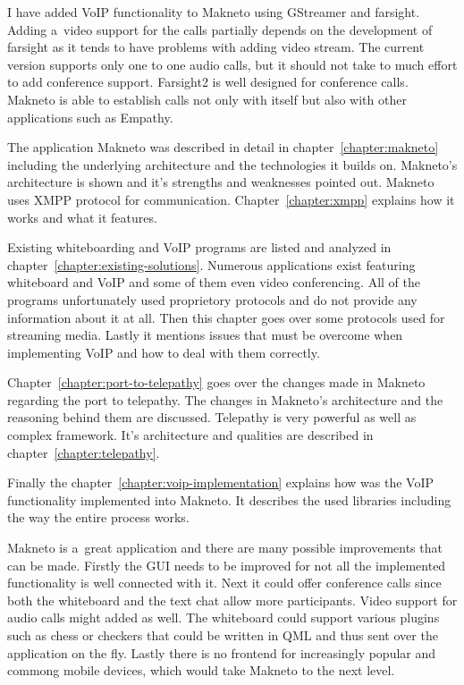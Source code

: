 I have added VoIP functionality to Makneto using GStreamer and farsight. Adding a~video support for the calls partially depends on the development of farsight as it tends to have problems with adding video stream. The current version supports only one to one audio calls, but it should not take to much effort to add conference support. Farsight2 is well designed for conference calls. Makneto is able to establish calls not only with itself but also with other applications such as Empathy. 

The application Makneto was described in detail in chapter~\ref{chapter:makneto} including the underlying architecture and the technologies it builds on. Makneto's architecture is shown and it's strengths and weaknesses pointed out. Makneto uses XMPP protocol for communication. Chapter~\ref{chapter:xmpp} explains how it works and what it features.

Existing whiteboarding and VoIP programs are listed and analyzed in chapter~\ref{chapter:existing-solutions}. Numerous applications exist featuring whiteboard and VoIP and some of them even video conferencing. All of the programs unfortunately used proprietory protocols and do not provide any information about it at all. Then this chapter goes over some protocols used for streaming media. Lastly it mentions issues that must be overcome when implementing VoIP and how to deal with them correctly. 

Chapter~\ref{chapter:port-to-telepathy} goes over the changes made in Makneto regarding the port to telepathy. The changes in Makneto's architecture and the reasoning behind them are discussed. Telepathy is very powerful as well as complex framework. It's architecture and qualities are described in chapter~\ref{chapter:telepathy}. 

Finally the chapter~\ref{chapter:voip-implementation} explains how was the VoIP functionality implemented into Makneto. It describes the used libraries 
including the way the entire process works.

Makneto is a~great application and there are many possible improvements that can be made. Firstly the GUI needs to be improved for not all the implemented functionality is well connected with it. Next it could offer conference calls since both the whiteboard and the text chat allow more participants. Video support for audio calls might added as well. The whiteboard could support various plugins such as chess or checkers that could be written in QML and thus sent over the application on the fly. Lastly there is no frontend for increasingly popular and commong mobile devices, which would take Makneto to the next level.
